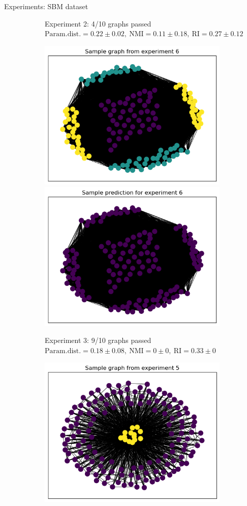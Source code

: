 \documentclass[final]{beamer}
\newlength{\colwidth}
\begin{document}
\begin{frame}[t]
\begin{columns}[t]
\begin{column}{\colwidth}
\begin{block}{Experiments: SBM dataset}
\begin{figure}[h]
\begin{subfigure}{0.49\linewidth}
            \caption{\centering Experiment 2: 4/10 graphs passed\\ $\mathrm{Param. dist.} = 0.22 \pm 0.02, \ \mathrm{NMI} = 0.11 \pm 0.18, \ \mathrm{RI} = 0.27 \pm 0.12$}
            \label{fig:exp2}
          \end{subfigure}
          \medskip
          \begin{subfigure}{0.49\linewidth}
            \centering
            \includegraphics[width=0.49\linewidth, trim={5 5 5 18}, clip]{figures/exp6_sample.png}
            \includegraphics[width=0.49\linewidth, trim={5 5 5 18}, clip]{figures/exp6_pred.png}
            \caption{\centering Experiment 3: 9/10 graphs passed\\ $\mathrm{Param. dist.} = 0.18 \pm 0.08, \ \mathrm{NMI} = 0 \pm 0, \ \mathrm{RI} = 0.33 \pm 0$}
            \label{fig:exp3}
          \end{subfigure}
          \hfill
          \begin{subfigure}{0.49\linewidth}
            \centering
            \includegraphics[width=0.49\linewidth, trim={5 5 5 18}, clip]{figures/exp5_sample.png}

\end{subfigure}
\end{figure}
\end{block}
\end{column}
\end{columns}
\end{frame}
\end{document}

